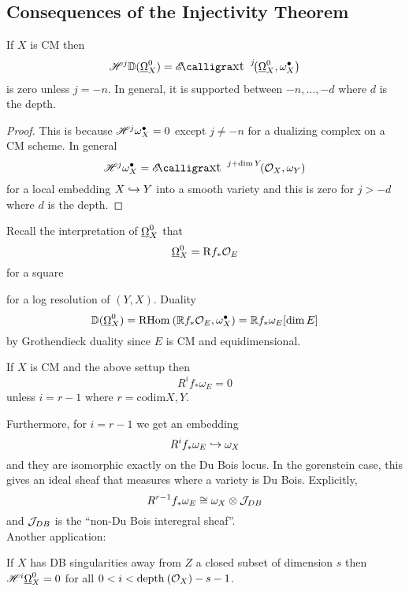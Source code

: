 \documentclass[12pt]{article}
\newcommand{\R}{\mathrm{R}}
\renewcommand{\codim}{\mathrm{codim}}
\begin{document}
\subsection{Consequences of the Injectivity Theorem}

\begin{cor}
If $X$ is CM then 
\[ \H^j \DD(\ulO_X^0) = \shExt{j}{}{\ulO_X^0}{\omega_X^\bullet} \]
is zero unless $j = -n$. In general, it is supported between $-n, \dots, -d$ where $d$ is the depth.
\end{cor}

\begin{proof}
This is because $\mathscr{H}^j \omega_X^\bullet = 0$ except $j \neq -n$ for a dualizing complex on a CM scheme. In general
\[ \H^j \omega_X^\bullet = \shExt{j+\dim{Y}}{}{\struct{X}}{\omega_Y} \]
for a local embedding $X \hookrightarrow Y$ into a smooth variety and this is zero for $j > -d$ where $d$ is the depth. 
\end{proof}

Recall the interpretation of $\underline{\Omega}_X^0$ that 
\[ \ulO_X^0 = \R f_* \struct{E} \]
for a square
\begin{center}
\end{center}
for a log resolution of $(Y, X)$. Duality
\[ \mathbb{D}(\underline{\Omega}_X^0) = \mathrm{RHom}_{} \left( \mathbb{R} f_* \mathcal{O}_{E}, \omega_X^\bullet \right) = \mathbb{R} f_* \omega_E [\dim{E}] \]
by Grothendieck duality since $E$ is CM and equidimensional. 

\begin{cor}
If $X$ is CM and the above settup then
\[ R^i f_* \omega_E = 0 \]
unless $i = r - 1$ where $r = \codim{X,Y}$.
\end{cor}


Furthermore, for $i = r-1$ we get an embedding
\[ R^i f_* \omega_E \hookrightarrow \omega_X \]
and they are isomorphic exactly on the Du Bois locus. In the gorenstein case, this gives an ideal sheaf that measures where a variety is Du Bois. Explicitly,
\[ R^{r-1} f_* \omega_E \cong \omega_X \otimes \mathcal{J}_{DB} \]
and $\mathcal{J}_{DB}$ is the ``non-Du Bois interegral sheaf''. 
\bigskip\\
Another application: 

\begin{cor}
If $X$ has DB singularities away from $Z$ a closed subset of dimension $s$ then $\mathscr{H}^i \underline{\Omega}_X^0 = 0$ for all $0 < i < \mathrm{depth}_{} \left( \mathcal{O}_{X} \right) - s - 1$. 
\end{cor}
\end{document}
